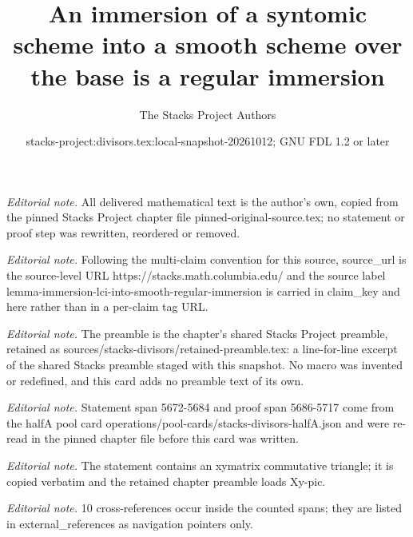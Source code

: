 \documentclass[10pt,a4paper]{amsart}
\title{An immersion of a syntomic scheme into a smooth scheme over the base is a regular immersion}
\author{The Stacks Project Authors}
\date{stacks-project:divisors.tex:local-snapshot-20261012; GNU FDL 1.2 or later}
\theoremstyle{plain}
\theoremstyle{definition}
\theoremstyle{remark}
\numberwithin{equation}{subsection}
\begin{document}
\maketitle
\noindent\textit{Editorial note.} All delivered mathematical text is the author's own, copied from the pinned Stacks Project chapter file pinned-original-source.tex; no statement or proof step was rewritten, reordered or removed.\par\medskip
\noindent\textit{Editorial note.} Following the multi-claim convention for this source, source\_url is the source-level URL https://stacks.math.columbia.edu/ and the source label lemma-immersion-lci-into-smooth-regular-immersion is carried in claim\_key and here rather than in a per-claim tag URL.\par\medskip
\noindent\textit{Editorial note.} The preamble is the chapter's shared Stacks Project preamble, retained as sources/stacks-divisors/retained-preamble.tex: a line-for-line excerpt of the shared Stacks preamble staged with this snapshot. No macro was invented or redefined, and this card adds no preamble text of its own.\par\medskip
\noindent\textit{Editorial note.} Statement span 5672-5684 and proof span 5686-5717 come from the halfA pool card operations/pool-cards/stacks-divisors-halfA.json and were re-read in the pinned chapter file before this card was written.\par\medskip
\noindent\textit{Editorial note.} The statement contains an xymatrix commutative triangle; it is copied verbatim and the retained chapter preamble loads Xy-pic.\par\medskip
\noindent\textit{Editorial note.} 10 cross-references occur inside the counted spans; they are listed in external\_references as navigation pointers only.\par\medskip
\end{document}
